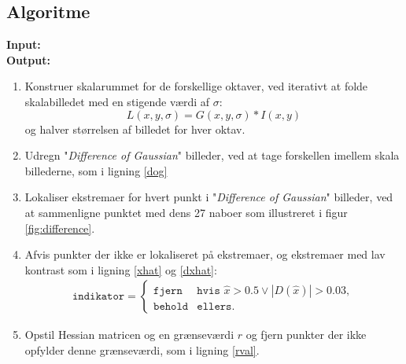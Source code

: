 \subsection{Algoritme}
\textbf{Input:} \\
\textbf{Output:}
\begin{enumerate}
\item{Konstruer skalarummet for de forskellige oktaver, ved iterativt at folde skalabilledet med en stigende værdi af $\sigma$: $$ L(x,y,\sigma)= G(x,y,\sigma) \ast I(x,y) $$
og halver størrelsen af billedet for hver oktav.}
\item{Udregn "\textit{Difference of Gaussian}" billeder, ved at tage forskellen imellem skala billederne, som i ligning \eqref{dog}}
\item{Lokaliser ekstremaer for hvert punkt i "\textit{Difference of Gaussian}" billeder, ved at sammenligne punktet med dens 27 naboer som illustreret i figur \ref{fig:difference}.}

\item{Afvis punkter der ikke er lokaliseret på ekstremaer, og ekstremaer med lav kontrast som i ligning \eqref{xhat} og \eqref{dxhat}:
\begin{equation}
\begin{split}
\texttt{indikator} = 
\begin{cases}
\texttt{fjern}& \texttt{hvis } \hat{x}>0.5 \lor |D(\hat{x})|>0.03 , \\
\texttt{behold}& \texttt{ellers}. 
\end{cases}
\end{split}
\label{maxsurp}
\end{equation}
}
\item{Opstil Hessian matricen og en grænseværdi $r$ og fjern punkter der ikke opfylder denne grænseværdi, som i ligning \eqref{rval}.}
\end{enumerate}